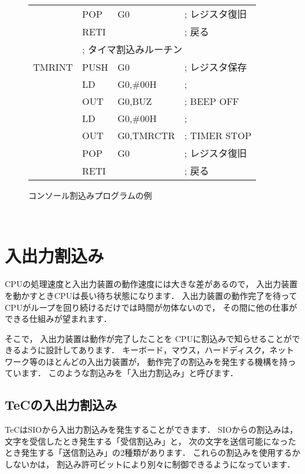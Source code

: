 \begin{figure}[bt]
{\begin{center}
\begin{tabular}{|l|l l l|}
       & POP    & G0                & ; レジスタ復旧  \\
       & RETI   &                   & ; 戻る  \\
       & \multicolumn{3}{|l|}{; タイマ割込みルーチン}       \\
TMRINT & PUSH   & G0                & ; レジスタ保存  \\
       & LD     & G0,\#00H          & ;   \\
       & OUT    & G0,BUZ            & ; BEEP OFF  \\
       & LD     & G0,\#00H          & ;  \\
       & OUT    & G0,TMRCTR         & ; TIMER STOP  \\
       & POP    & G0                & ; レジスタ復旧  \\
       & RETI   &                   & ; 戻る  \\
\hline
\end{tabular}
\end{center}}
\caption{コンソール割込みプログラムの例}
\label{fig:chap6:cons}
\end{figure}

\newpage  %
~         %
\newpage
\section{入出力割込み}
\label{chap6:ioint}

CPUの処理速度と入出力装置の動作速度には大きな差があるので，
入出力装置を動かすときCPUは長い待ち状態になります．
入出力装置の動作完了を待って
CPUがループを回り続けるだけでは時間が勿体ないので，
その間に他の仕事ができる仕組みが望まれます．

そこで，
入出力装置は動作が完了したことを
CPUに割込みで知らせることができるように設計してあります．
キーボード，マウス，ハードディスク，ネットワーク等のほとんどの入出力装置が，
動作完了の割込みを発生する機構を持っています．
このような割込みを「入出力割込み」と呼びます．

\subsection{TeCの入出力割込み}
TeCはSIOから入出力割込みを発生することができます．
SIOからの割込みは，
文字を受信したとき発生する「受信割込み」と，
次の文字を送信可能になったとき発生する「送信割込み」の2種類があります．
これらの割込みを使用するかしないかは，
割込み許可ビットにより別々に制御できるようになっています．

